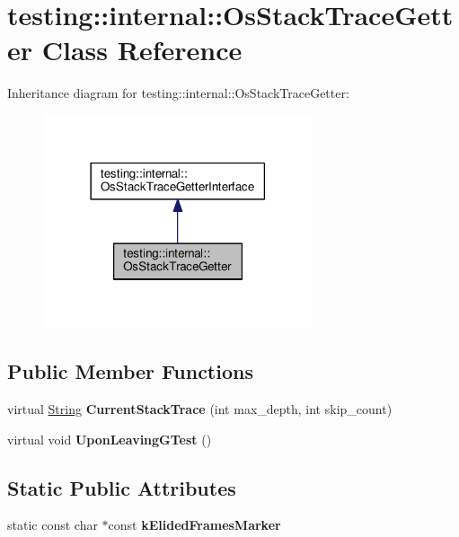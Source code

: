 \hypertarget{classtesting_1_1internal_1_1_os_stack_trace_getter}{}\section{testing\+:\+:internal\+:\+:Os\+Stack\+Trace\+Getter Class Reference}
\label{classtesting_1_1internal_1_1_os_stack_trace_getter}


Inheritance diagram for testing\+:\+:internal\+:\+:Os\+Stack\+Trace\+Getter\+:
\nopagebreak
\begin{figure}[H]
\begin{center}
\leavevmode
\includegraphics[width=225pt]{classtesting_1_1internal_1_1_os_stack_trace_getter__inherit__graph}
\end{center}
\end{figure}
\subsection*{Public Member Functions}
\begin{DoxyCompactItemize}
\item 
\mbox{\label{classtesting_1_1internal_1_1_os_stack_trace_getter_ae295cb542896b3812ce2a4d1430cedf0}} 
virtual \mbox{\hyperlink{classtesting_1_1internal_1_1_string}{String}} {\bfseries Current\+Stack\+Trace} (int max\+\_\+depth, int skip\+\_\+count)
\item 
\mbox{\label{classtesting_1_1internal_1_1_os_stack_trace_getter_a8ae0237629b6b5672b4b5ef8e292205c}} 
virtual void {\bfseries Upon\+Leaving\+G\+Test} ()
\end{DoxyCompactItemize}
\subsection*{Static Public Attributes}
\begin{DoxyCompactItemize}
\item 
static const char $\ast$const {\bfseries k\+Elided\+Frames\+Marker}
\end{DoxyCompactItemize}


